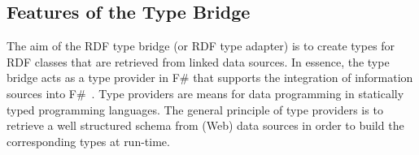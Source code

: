 \documentclass{llncs} %
\newcommand{\fs}{\textsf{F\#}\xspace}
\begin{document}





\subsection{Features of the Type Bridge}



The aim of the RDF type bridge (or RDF type adapter) is to create types for RDF classes that
are retrieved from linked data sources. 
In essence, the type bridge acts as a type provider in \fs that supports the integration of information sources
into \fs~\cite{Syme2012fsharp}. Type providers are means for data programming
in statically typed programming languages.
The general principle of type providers is 
to retrieve a well structured schema from (Web) data sources in order to build
the corresponding types at run-time.
\end{document}
